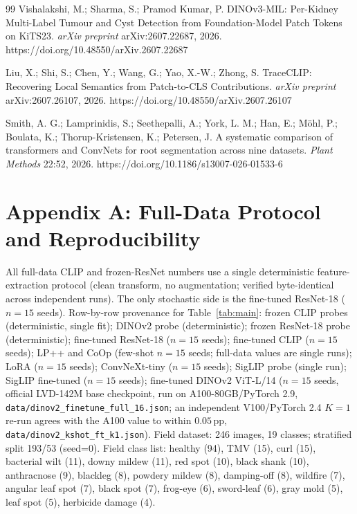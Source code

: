 \documentclass[10pt,a4paper]{article}
\begin{document}
\begin{thebibliography}{99}
Vishalakshi, M.; Sharma, S.; Pramod Kumar, P.
DINOv3-MIL: Per-Kidney Multi-Label Tumour and Cyst Detection from Foundation-Model Patch Tokens on KiTS23.
\emph{arXiv preprint} arXiv:2607.22687, 2026.
https://doi.org/10.48550/arXiv.2607.22687

Liu, X.; Shi, S.; Chen, Y.; Wang, G.; Yao, X.-W.; Zhong, S.
TraceCLIP: Recovering Local Semantics from Patch-to-CLS Contributions.
\emph{arXiv preprint} arXiv:2607.26107, 2026.
https://doi.org/10.48550/arXiv.2607.26107

Smith, A. G.; Lamprinidis, S.; Seethepalli, A.; York, L. M.; Han, E.; M\"ohl, P.; Boulata, K.; Thorup-Kristensen, K.; Petersen, J.
A systematic comparison of transformers and ConvNets for root segmentation across nine datasets.
\emph{Plant Methods} 22:52, 2026.
https://doi.org/10.1186/s13007-026-01533-6

\end{thebibliography}

\section*{Appendix A: Full-Data Protocol and Reproducibility}
\label{appx:protocol}

All full-data CLIP and frozen-ResNet numbers use a single deterministic feature-extraction protocol (clean transform, no augmentation; verified byte-identical across independent runs). The only stochastic side is the fine-tuned ResNet-18 ($n{=}15$ seeds). Row-by-row provenance for Table~\ref{tab:main}: frozen CLIP probes (deterministic, single fit); DINOv2 probe (deterministic); frozen ResNet-18 probe (deterministic); fine-tuned ResNet-18 ($n{=}15$ seeds); fine-tuned CLIP ($n{=}15$ seeds); LP++ and CoOp (few-shot $n{=}15$ seeds; full-data values are single runs); LoRA ($n{=}15$ seeds); ConvNeXt-tiny ($n{=}15$ seeds); SigLIP probe (single run); SigLIP fine-tuned ($n{=}15$ seeds); fine-tuned DINOv2 ViT-L/14 ($n{=}15$ seeds, official LVD-142M base checkpoint, run on A100-80GB/PyTorch 2.9, \texttt{data/dinov2\_finetune\_full\_16.json}; an independent V100/PyTorch 2.4 $K{=}1$ re-run agrees with the A100 value to within $0.05$\,pp, \texttt{data/dinov2\_kshot\_ft\_k1.json}). Field dataset: 246 images, 19 classes; stratified split 193/53 (seed=0). Field class list: healthy (94), TMV (15), curl (15), bacterial wilt (11), downy mildew (11), red spot (10), black shank (10), anthracnose (9), blackleg (8), powdery mildew (8), damping-off (8), wildfire (7), angular leaf spot (7), black spot (7), frog-eye (6), sword-leaf (6), gray mold (5), leaf spot (5), herbicide damage (4).
\end{document}
